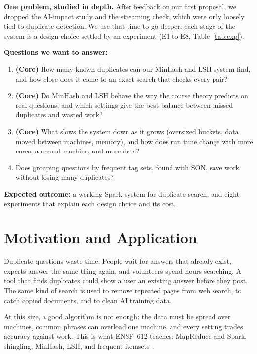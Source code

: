 \documentclass[11pt,a4paper]{article}
\begin{document}
\textbf{One problem, studied in depth.} After feedback on our first proposal,
we dropped the AI-impact study and the streaming check, which were only loosely
tied to duplicate detection. We use that time to go deeper: each stage of the
system is a design choice settled by an experiment (E1 to E8, Table~\ref{tab:exp}).

\textbf{Questions we want to answer:}
\begin{enumerate}[label=\textbf{Q\arabic*.},leftmargin=2.2em]
  \item \textbf{(Core)} How many known duplicates can our MinHash and LSH
        system find, and how close does it come to an exact search that checks
        every pair?
  \item \textbf{(Core)} Do MinHash and LSH behave the way the course theory
        predicts on real questions, and which settings give the best balance
        between missed duplicates and wasted work?
  \item \textbf{(Core)} What slows the system down as it grows (oversized
        buckets, data moved between machines, memory), and how does run time
        change with more cores, a second machine, and more data?
  \item Does grouping questions by frequent tag sets, found with SON, save work
        without losing many duplicates?
\end{enumerate}

\textbf{Expected outcome:} a working Spark system for duplicate search, and
eight experiments that explain each design choice and its cost.

\section{Motivation and Application}

Duplicate questions waste time. People wait for answers that already exist,
experts answer the same thing again, and volunteers spend hours searching. A
tool that finds duplicates could show a user an existing answer before they
post. The same kind of search is used to remove repeated pages from web search,
to catch copied documents, and to clean AI training data.

At this size, a good algorithm is not enough: the data must be spread over
machines, common phrases can overload one machine, and every setting trades
accuracy against work. This is what ENSF~612 teaches: MapReduce and Spark,
shingling, MinHash, LSH, and frequent itemsets~\cite{mmds}.
\end{document}
